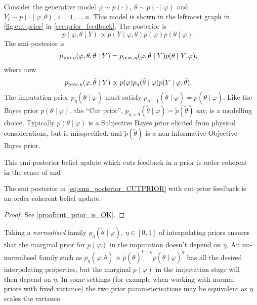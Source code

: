 Consider the generative model $\varphi \sim p(\cdot),\ \theta  \sim p(\cdot \mid \varphi)$ and $Y_i \sim p(\cdot \mid \varphi,\theta),\ i=1,...,n.$
This model is shown in the leftmost graph in \cref{fig:cut-prior} in \cref{sec:prior_feedback}. The posterior is
\[
  p(\varphi,\theta \mid Y)\propto p(Y \mid \varphi,\theta)p(\varphi)p(\theta \mid \varphi).
\]
The \acrshort*{smi}-posterior is
\begin{equation}\label{eq:smi_posterior_CUTPRIOR}
  p_{\operatorname{\text{smi}},\eta}(\varphi,\theta,\tilde\theta \mid Y)=p_{\operatorname{\text{pow}},\eta}(\varphi,\tilde\theta \mid Y)p(\theta \mid Y,\varphi),
\end{equation}
where now
\[
  p_{\operatorname{\text{pow}},\eta}(\varphi,\tilde\theta \mid Y)\propto p(\varphi)p_\eta(\tilde\theta \mid \varphi)p(Y \mid \varphi,\tilde\theta).
\]
The imputation prior $p_\eta(\tilde\theta \mid \varphi)$ must satisfy $p_{\eta=1}(\tilde\theta \mid \varphi)=p(\tilde\theta \mid \varphi)$. Like the Bayes prior $p(\theta \mid \varphi)$, the ``Cut prior'', $p_{\eta=0}(\tilde\theta \mid \varphi)=\tilde p(\tilde\theta)$ say, is a modelling choice.
Typically $p(\theta \mid \varphi)$ is a Subjective Bayes prior elicited from physical considerations, but is misspecified, and $\tilde p(\tilde\theta)$ is a non-informative Objective Bayes prior.

This \acrshort*{smi}-posterior belief update which cuts feedback in a prior is order coherent in the sense of \cite{Bissiri2016} and \cite{Nicholls2022smi}.
\begin{proposition}\label{prop:smi_cut_prior_is_OK}
  The \acrshort*{smi} posterior in \cref{eq:smi_posterior_CUTPRIOR} with cut prior feedback is an order coherent belief update.
\end{proposition}
\begin{proof}
  See \cref{proof:cut_prior_is_OK}.
\end{proof}

Taking a \emph{normalised} family $p_\eta(\tilde\theta \mid \varphi),\ \eta\in [0,1]$ of interpolating priors ensures that the marginal prior for $p(\varphi)$ in the imputation doesn't depend on $\eta$. An un-normalised family such as $p_\eta(\varphi,\tilde\theta)\propto \tilde p(\tilde\theta)^{1-\eta} p(\tilde\theta \mid \varphi)^\eta$ has all the desired interpolating properties, but the marginal $p(\varphi)$ in the imputation stage will then depend on $\eta$.
In some settings (for example when working with normal priors with fixed variance) the two prior parameterisations may be equivalent as $\eta$ scales the variance.

